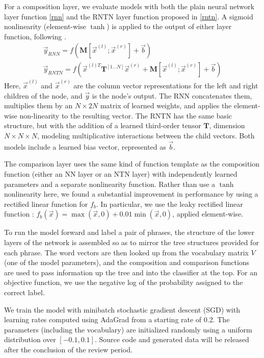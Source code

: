For a composition layer, we evaluate models with both the plain neural
network layer function \eqref{rnn} and the RNTN layer function
proposed in \citet{chen2013learning} \eqref{rntn}. A sigmoid
nonlinearity (element-wise $\tanh$) is applied to the output of either
layer function, following \cite{socher2013acl1}.
%
\begin{gather} \label{rnn}
\vec{y}_{\textit{RNN}} = f(\mathbf{M} [\vec{x}^{(l)}; \vec{x}^{(r)}] + \vec{b}) \\ %
\label{rntn}
\vec{y}_{\textit{RNTN}} = f(\vec{x}^{(l)T} \mathbf{T}^{[1 \ldots N]} \vec{x}^{(r)} + \mathbf{M} [\vec{x}^{(l)}; \vec{x}^{(r)}] + \vec{b})
\end{gather} %
%
Here, $\vec{x}^{(l)}$ and $\vec{x}^{(r)}$ are the column vector
representations for the left and right children of the node, and
$\vec{y}$ is the node's output.  The RNN concatenates them, multiplies
them by an $N \times 2N$ matrix of learned weights, and applies the
element-wise non-linearity to the resulting vector. The RNTN has the
same basic structure, but with the addition of a learned third-order
tensor $\mathbf{T}$, dimension $N \times N \times N$, modeling
multiplicative interactions between the child vectors. Both models
include a learned bias vector, represented as $\vec{b}$.

The comparison layer uses the same kind of function template as the
composition function (either an NN layer or an NTN layer) with
independently learned parameters and a separate nonlinearity function.
Rather than use a $\tanh$ nonlinearity here, we found a substantial
improvement in performance by using a rectified linear function for
$f_{b}$. In particular, we use the leaky rectified linear function
\cite{maasrectifier}: $f_{b}(\vec{x})=\max(\vec{x}, 0) +
0.01\min(\vec{x}, 0)$, applied element-wise.

To run the model forward and label a pair of phrases, the structure of
the lower layers of the network is assembled so as to mirror the tree
structures provided for each phrase. The word vectors are then looked
up from the vocabulary matrix $V$ (one of the model parameters), and
the composition and comparison functions are used to pass information
up the tree and into the classifier at the top. For an objective
function, we use the negative log of the probability assigned to the
correct label.

We train the model with minibatch stochastic gradient descent (SGD)
with learning rates computed using AdaGrad \cite{duchi2011adaptive}
from a starting rate of 0.2. The parameters (including the vocabulary)
are initialized randomly using a uniform distribution over $[-0.1,
0.1]$. %
Source code and generated data will be released after the conclusion
of the review period.

